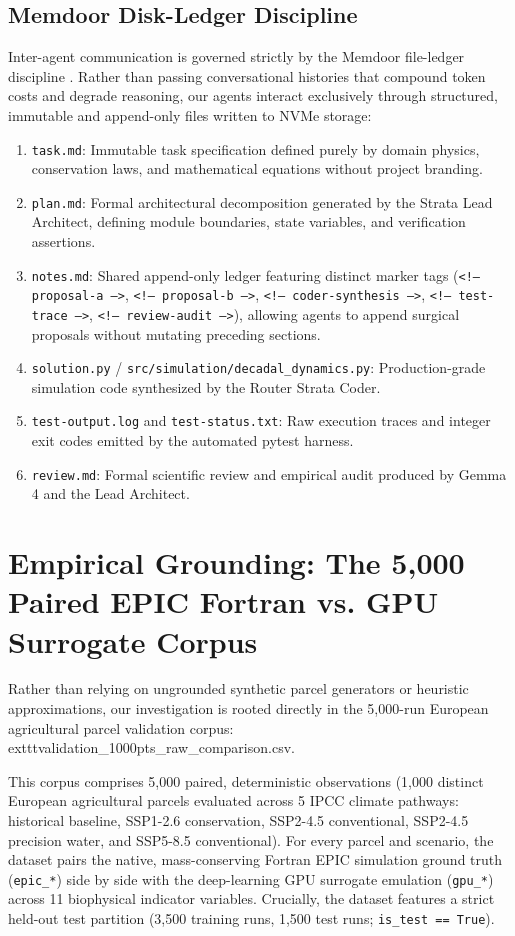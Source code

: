 \documentclass[11pt,a4paper]{article}
\begin{document}
\subsection{Memdoor Disk-Ledger Discipline}
Inter-agent communication is governed strictly by the Memdoor file-ledger discipline \cite{memdoor2024}. Rather than passing conversational histories that compound token costs and degrade reasoning, our agents interact exclusively through structured, immutable and append-only files written to NVMe storage:
\begin{enumerate}
    \item \texttt{task.md}: Immutable task specification defined purely by domain physics, conservation laws, and mathematical equations without project branding.
    \item \texttt{plan.md}: Formal architectural decomposition generated by the Strata Lead Architect, defining module boundaries, state variables, and verification assertions.
    \item \texttt{notes.md}: Shared append-only ledger featuring distinct marker tags (\texttt{<!-- proposal-a -->}, \texttt{<!-- proposal-b -->}, \texttt{<!-- coder-synthesis -->}, \texttt{<!-- test-trace -->}, \texttt{<!-- review-audit -->}), allowing agents to append surgical proposals without mutating preceding sections.
    \item \texttt{solution.py} / \texttt{src/simulation/decadal\_dynamics.py}: Production-grade simulation code synthesized by the Router Strata Coder.
    \item \texttt{test-output.log} and \texttt{test-status.txt}: Raw execution traces and integer exit codes emitted by the automated pytest harness.
    \item \texttt{review.md}: Formal scientific review and empirical audit produced by Gemma 4 and the Lead Architect.
\end{enumerate}

\section{Empirical Grounding: The 5,000 Paired EPIC Fortran vs. GPU Surrogate Corpus}
Rather than relying on ungrounded synthetic parcel generators or heuristic approximations, our investigation is rooted directly in the 5,000-run European agricultural parcel validation corpus: 	exttt{validation\_1000pts\_raw\_comparison.csv}.

This corpus comprises 5,000 paired, deterministic observations (1,000 distinct European agricultural parcels evaluated across 5 IPCC climate pathways: historical baseline, SSP1-2.6 conservation, SSP2-4.5 conventional, SSP2-4.5 precision water, and SSP5-8.5 conventional). For every parcel and scenario, the dataset pairs the native, mass-conserving Fortran EPIC simulation ground truth (\texttt{epic\_*}) \cite{williams1989epic} side by side with the deep-learning GPU surrogate emulation (\texttt{gpu\_*}) across 11 biophysical indicator variables. Crucially, the dataset features a strict held-out test partition (3,500 training runs, 1,500 test runs; \texttt{is\_test == True}).
\end{document}
